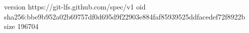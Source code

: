 version https://git-lfs.github.com/spec/v1
oid sha256:bbe9b952a02b69757df0d695d9f22903e884faf85939525ddfacedef72f8922b
size 196704
